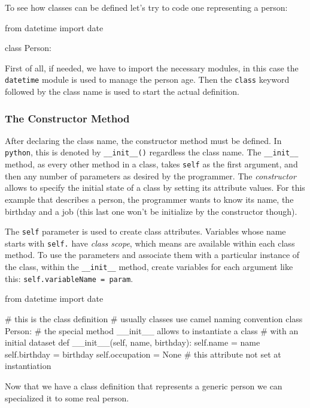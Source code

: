 To see how classes can be defined let's try to code one representing a person:
\begin{ipythonnon}
from datetime import date        

class Person:
\end{ipythonnon}

First of all, if needed, we have to import the necessary modules, in this case the \texttt{datetime} module is used to manage the person age.
Then the \texttt{class} keyword followed by the class name is used to start the actual definition.

\subsubsection{The Constructor Method}\label{the-constructor-method}

After declaring the class name, the constructor method must be defined. In \texttt{python}, this is denoted by \texttt{\_\_init\_\_()} regardless the class name. The \texttt{\_\_init\_\_} method, as every other method in a class, takes \texttt{self} as the first argument, and then any number of parameters as desired by the programmer. The \emph{constructor} allows to specify the initial state of a class by setting its attribute values. For this example that describes a person, the programmer wants to know its name, the birthday and a job (this last one won't be initialize by the constructor though).

The \texttt{self} parameter is used to create class attributes. Variables whose name starts with \texttt{self.} have \emph{class scope}, which means are available within each class method. To use the parameters and associate them with a particular instance of the class, within the \texttt{\_\_init\_\_} method, create variables for each argument like this: \texttt{self.variableName\ =\ param}.

\begin{ipythonnon}
from datetime import date

# this is the class definition
# usually classes use camel naming convention
class Person:
    # the special method __init__ allows to instantiate a class
    # with an initial dataset
    def __init__(self, name, birthday):
        self.name = name
        self.birthday = birthday
        self.occupation = None # this attribute not set at instantiation
\end{ipythonnon}

Now that we have a class definition that represents a generic person we can specialized it to some real person.

